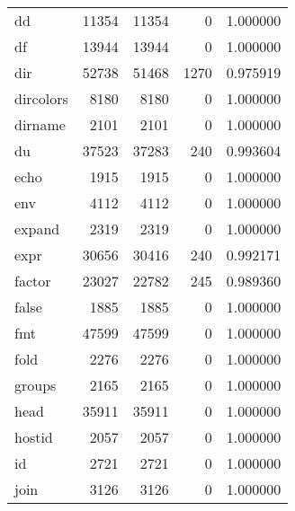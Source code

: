\begin{tabular}{lrrrr}
dd        &                    11354 &        11354 &             0 &                 1.000000 \\
df        &                    13944 &        13944 &             0 &                 1.000000 \\
dir       &                    52738 &        51468 &          1270 &                 0.975919 \\
dircolors &                     8180 &         8180 &             0 &                 1.000000 \\
dirname   &                     2101 &         2101 &             0 &                 1.000000 \\
du        &                    37523 &        37283 &           240 &                 0.993604 \\
echo      &                     1915 &         1915 &             0 &                 1.000000 \\
env       &                     4112 &         4112 &             0 &                 1.000000 \\
expand    &                     2319 &         2319 &             0 &                 1.000000 \\
expr      &                    30656 &        30416 &           240 &                 0.992171 \\
factor    &                    23027 &        22782 &           245 &                 0.989360 \\
false     &                     1885 &         1885 &             0 &                 1.000000 \\
fmt       &                    47599 &        47599 &             0 &                 1.000000 \\
fold      &                     2276 &         2276 &             0 &                 1.000000 \\
groups    &                     2165 &         2165 &             0 &                 1.000000 \\
head      &                    35911 &        35911 &             0 &                 1.000000 \\
hostid    &                     2057 &         2057 &             0 &                 1.000000 \\
id        &                     2721 &         2721 &             0 &                 1.000000 \\
join      &                     3126 &         3126 &             0 &                 1.000000 \\

\end{tabular}
